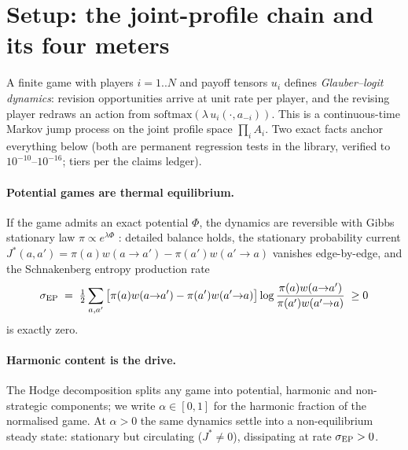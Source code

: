 \section{Setup: the joint-profile chain and its four meters}
\label{sec:setup}

A finite game with players $i=1..N$ and payoff tensors $u_i$ defines
\emph{Glauber--logit dynamics}: revision opportunities arrive at unit rate per
player, and the revising player redraws an action from
$\mathrm{softmax}(\lambda\, u_i(\cdot, a_{-i}))$. This is a continuous-time
Markov jump process on the joint profile space $\prod_i A_i$. Two exact facts
anchor everything below (both are permanent regression tests in the library,
verified to $10^{-10}$--$10^{-16}$; tiers per the claims ledger).

\paragraph{Potential games are thermal equilibrium.} If the game admits an
exact potential $\Phi$, the dynamics are reversible with Gibbs stationary law
$\pi \propto e^{\lambda\Phi}$ \citep{blume1993}: detailed balance holds, the
stationary probability current $J^*(a,a') = \pi(a)w(a{\to}a') -
\pi(a')w(a'{\to}a)$ vanishes edge-by-edge, and the Schnakenberg entropy
production rate \citep{schnakenberg1976}
\begin{equation}
\sigma_{\mathrm{EP}} \;=\; \tfrac12 \sum_{a,a'} \big[\pi(a)w(a{\to}a') - \pi(a')w(a'{\to}a)\big]
\log\frac{\pi(a)w(a{\to}a')}{\pi(a')w(a'{\to}a)} \;\ge 0
\end{equation}
is exactly zero.

\paragraph{Harmonic content is the drive.} The Hodge decomposition
\citep{candogan2011} splits any game into potential, harmonic and
non-strategic components; we write $\alpha \in [0,1]$ for the harmonic
fraction of the normalised game. At $\alpha>0$ the same dynamics settle into a
non-equilibrium steady state: stationary but circulating ($J^* \neq 0$),
dissipating at rate $\sigma_{\mathrm{EP}} > 0$.


